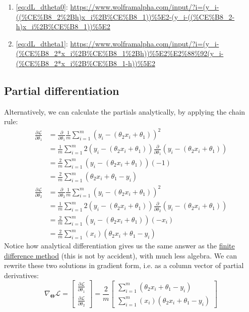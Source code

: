 \documentclass[12pt,initial,twoside,maitrise]{dms}
\numberwithin{equation}{section}
\numberwithin{table}{chapter}
\numberwithin{figure}{chapter}
\begin{document}
%
\begin{enumerate}
    \item[] \autoref{eq:dL_dtheta0}: \url{https://www.wolframalpha.com/input/?i=(y_i-((%CE%B8_2%2Bh)x_i%2B%CE%B8_1))%5E2-(y_i-((%CE%B8_2-h)x_i%2B%CE%B8_1))%5E2}
    \item[] \autoref{eq:dL_dtheta1}: \url{https://www.wolframalpha.com/input/?i=(y_i-(%CE%B8_2*x_i%2B%CE%B8_1%2Bh))%5E2%E2%88%92(y_i-(%CE%B8_2*x_i%2B%CE%B8_1-h))%5E2}
\end{enumerate}

\subsection{Partial differentiation}

\noindent Alternatively, we can calculate the partials analytically, by applying the chain rule:
%
\begin{align}
\frac{\partial\mathcal{L}}{\partial \theta_1} & = \frac{\partial}{\partial \theta_1}\frac{1}{m}\sum_{i=1}^m(y_i - (\theta_2 x_i + \theta_1))^2 \\ & = \frac{1}{m}\sum_{i=1}^m 2 (y_i - (\theta_2 x_i + \theta_1))\frac{\partial}{\partial \theta_1}(y_i - (\theta_2 x_i + \theta_1)) \\ & = \frac{2}{m}\sum_{i=1}^m(y_i - (\theta_2 x_i + \theta_1))(-1) \\ & = \boxed{\frac{2}{m}\sum_{i=1}^m(\theta_2 x_i + \theta_1 - y_i)}
\end{align}
%
\begin{align}
\frac{\partial\mathcal{L}}{\partial \theta_2} & = \frac{\partial}{\partial \theta_2}\frac{1}{m}\sum_{i=1}^m(y_i - (\theta_2 x_i + \theta_1))^2 \\ & = \frac{1}{m}\sum_{i=1}^m 2(y_i - (\theta_2 x_i + \theta_1)) \frac{\partial}{\partial \theta_2}(y_i - (\theta_2 x_i + \theta_1)) \\ & = \frac{2}{m}\sum_{i=1}^m(y_i - (\theta_2 x_i + \theta_1))(-x_i) \\ & = \boxed{\frac{2}{m}\sum_{i=1}^m(x_i)(\theta_2 x_i + \theta_1 - y_i)}
\end{align}
%
Notice how analytical differentiation gives us the same answer as the \hyperref[sec:fdm]{finite difference method} (this is not by accident), with much less algebra. We can rewrite these two solutions in gradient form, i.e. as a column vector of partial derivatives:
%
\begin{equation}
\nabla_\mathbf{\Theta}\mathcal{L} =
\begin{bmatrix}
\frac{\partial\mathcal{L}}{\partial \theta_1} \\
\frac{\partial\mathcal{L}}{\partial \theta_2}
\end{bmatrix} = \frac{2}{m}
\begin{bmatrix}
\sum_{i=1}^m(\theta_2 x_i + \theta_1 - y_i) \\ \sum_{i=1}^m(x_i)(\theta_2 x_i + \theta_1 - y_i)
\end{bmatrix}
\end{equation}
\end{document}
